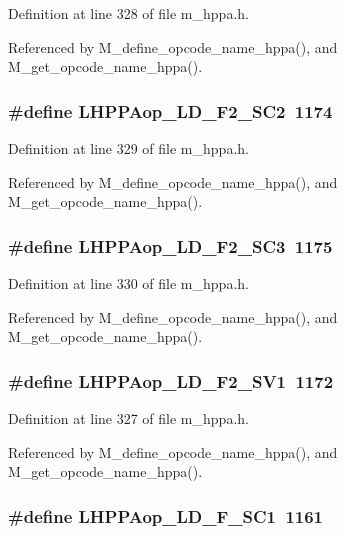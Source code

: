 Definition at line 328 of file m\_\-hppa.h.

Referenced by M\_\-define\_\-opcode\_\-name\_\-hppa(), and M\_\-get\_\-opcode\_\-name\_\-hppa().
\subsubsection{\setlength{\rightskip}{0pt plus 5cm}\#define LHPPAop\_\-LD\_\-F2\_\-SC2~1174}\label{m__hppa_8h_514f1bd9bbbfd1d120e2fc14e398bc4f}




Definition at line 329 of file m\_\-hppa.h.

Referenced by M\_\-define\_\-opcode\_\-name\_\-hppa(), and M\_\-get\_\-opcode\_\-name\_\-hppa().
\subsubsection{\setlength{\rightskip}{0pt plus 5cm}\#define LHPPAop\_\-LD\_\-F2\_\-SC3~1175}\label{m__hppa_8h_445715cdfecb163c189d9c89bfad43ad}




Definition at line 330 of file m\_\-hppa.h.

Referenced by M\_\-define\_\-opcode\_\-name\_\-hppa(), and M\_\-get\_\-opcode\_\-name\_\-hppa().
\subsubsection{\setlength{\rightskip}{0pt plus 5cm}\#define LHPPAop\_\-LD\_\-F2\_\-SV1~1172}\label{m__hppa_8h_77dfa47313c774c632242a0378e5c29d}




Definition at line 327 of file m\_\-hppa.h.

Referenced by M\_\-define\_\-opcode\_\-name\_\-hppa(), and M\_\-get\_\-opcode\_\-name\_\-hppa().
\subsubsection{\setlength{\rightskip}{0pt plus 5cm}\#define LHPPAop\_\-LD\_\-F\_\-SC1~1161}\label{m__hppa_8h_2fb3fc7ea183d8101cc9728d511beaf5}




